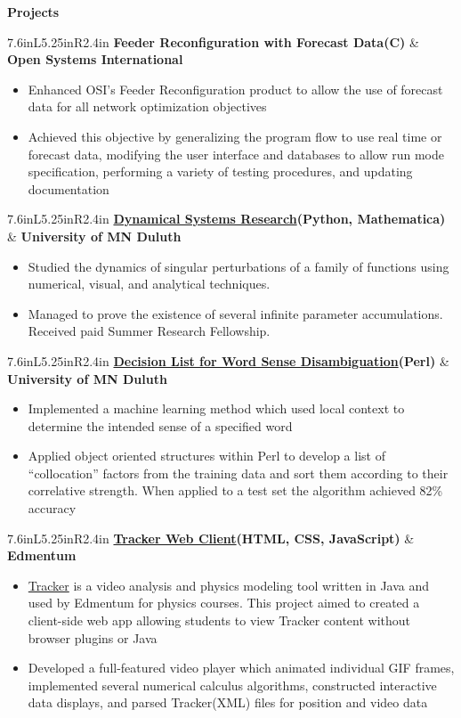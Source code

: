 \documentclass[letterpaper,10pt]{article}
\newcommand{\resitem}[1]{\item #1 

\vspace{-.1in}
}
\newcommand{\resheading}[1]{
	{
		\large\colorbox{mygrey}
		{
			\begin{minipage}{.98\textwidth}

			\centerline{\textbf{#1 \vphantom{p\^{E}}}}
\end{minipage}
}}
}
\newcommand{\ressubheadingg}[2]{
\begin{tabular*}{7.6in}{L{5.25in}R{2.4in}}
		\textbf{#1} & \textbf{#2}
\end{tabular*}}
\begin{document}
\resheading{Projects}
\ressubheadingg{Feeder Reconfiguration with Forecast Data(C)}{Open Systems International}
\vspace{-.25in}
\begin{itemize}
	\resitem{Enhanced OSI's Feeder Reconfiguration product to allow the use of forecast data for all network optimization objectives}
	\resitem{Achieved this objective by generalizing the program flow to use real time or forecast data, modifying the user interface and databases to allow run mode specification, performing a variety of testing procedures, and updating documentation}
\end{itemize}
\vspace{.1in}
\ressubheadingg{\href{https://www.researchgate.net/publication/281248352_Infinite_Levels_of_Complexity_in_a_Family_of_One-Dimensional_Singular_Dynamical_Systems}{Dynamical Systems Research}(Python, Mathematica)}{University of MN Duluth}
\vspace{-.25in}
\begin{itemize}
	\resitem{Studied the dynamics of singular perturbations of a family of functions using numerical, visual, and analytical techniques.}
	\resitem{Managed to prove the existence of several infinite parameter accumulations. Received paid Summer Research Fellowship.}
\end{itemize}
\vspace{.1in}
\ressubheadingg{\href{https://github.com/EvanOman/nlp-decision-list}{Decision List for Word Sense Disambiguation}(Perl)}{University of MN Duluth}
\vspace{-.25in}
\begin{itemize}
	\resitem{Implemented a machine learning method which used local context to determine the intended sense of a specified word}
	\resitem{Applied object oriented structures within Perl to develop a list of ``collocation'' factors from the training data and sort them according to their correlative strength. When applied to a test set the algorithm achieved 82\% accuracy}
\end{itemize}
\vspace{.1in}
\ressubheadingg{\href{https://github.com/EvanOman/Tracker-Browser-Client}{Tracker Web Client}(HTML, CSS, JavaScript)}{Edmentum}
\vspace{-.25in}
\begin{itemize}
	\resitem{\href{https://www.cabrillo.edu/~dbrown/tracker/}{Tracker} is a video analysis and physics modeling tool written in Java and used by Edmentum for physics courses. This project aimed to created a client-side web app allowing students to view Tracker content without browser plugins or Java}
	\resitem{Developed a full-featured video player which animated individual GIF frames, implemented several numerical calculus algorithms, constructed interactive data displays, and parsed Tracker(XML) files for position and video data}
\end{itemize}
\end{document}
